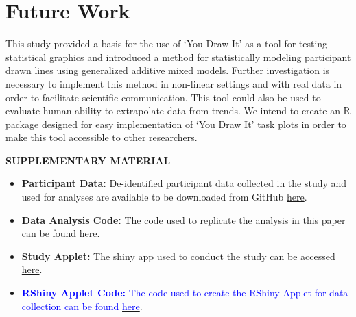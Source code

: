 \documentclass[12pt]{article}
\providecommand{\tightlist}{%
  \setlength{\itemsep}{0pt}\setlength{\parskip}{0pt}}
\begin{document}
\hypertarget{future-work}{%
\section{Future Work}\label{future-work}}

This study provided a basis for the use of `You Draw It' as a tool for
testing statistical graphics and introduced a method for statistically
modeling participant drawn lines using generalized additive mixed
models. Further investigation is necessary to implement this method in
non-linear settings and with real data in order to facilitate scientific
communication. This tool could also be used to evaluate human ability to
extrapolate data from trends. We intend to create an R package designed
for easy implementation of `You Draw It' task plots in order to make
this tool accessible to other researchers.

\begin{center}
{\large\bf SUPPLEMENTARY MATERIAL}
\end{center}

\begin{itemize}
\tightlist
\item
  \textbf{Participant Data:} De-identified participant data collected in
  the study and used for analyses are available to be downloaded from
  GitHub
  \href{https://github.com/earobinson95/Eye-Fitting-Straight-Lines-in-the-Modern-Era/tree/main/data}{here}.
\item
  \textbf{Data Analysis Code:} The code used to replicate the analysis
  in this paper can be found
  \href{https://earobinson95.github.io/Eye-Fitting-Straight-Lines-in-the-Modern-Era/analysis/you-draw-it-eyefitting-analysis.html}{here}.
\item
  \textbf{Study Applet:} The shiny app used to conduct the study can be
  accessed
  \href{https://emily-robinson.shinyapps.io/you-draw-it-validation-applet/}{here}.
\item
  \textbf{{\textcolor{blue}{RShiny Applet Code:}}}
  {\textcolor{blue}{The code used to create the RShiny Applet for data collection can be found}}
  \href{https://github.com/earobinson95/you-draw-it-validation-applet}{{\textcolor{blue}{here}}}.
\end{itemize}



\end{document}
